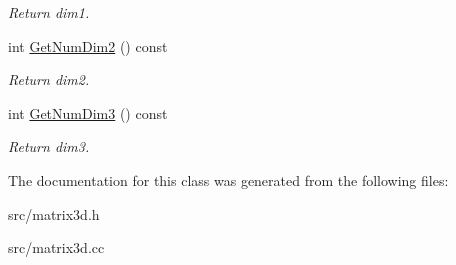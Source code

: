\begin{DoxyCompactItemize}
\begin{DoxyCompactList}\small\item\em Return dim1. \item\end{DoxyCompactList}\item 
\hypertarget{classMatrix3D_ad6895586f9041457377a2b4e0b5778ce}{
int \hyperlink{classMatrix3D_ad6895586f9041457377a2b4e0b5778ce}{GetNumDim2} () const }
\label{d0/dcb/classMatrix3D_ad6895586f9041457377a2b4e0b5778ce}

\begin{DoxyCompactList}\small\item\em Return dim2. \item\end{DoxyCompactList}\item 
\hypertarget{classMatrix3D_aa98e87c6887afa3141cd290818650932}{
int \hyperlink{classMatrix3D_aa98e87c6887afa3141cd290818650932}{GetNumDim3} () const }
\label{d0/dcb/classMatrix3D_aa98e87c6887afa3141cd290818650932}

\begin{DoxyCompactList}\small\item\em Return dim3. \item\end{DoxyCompactList}\end{DoxyCompactItemize}


The documentation for this class was generated from the following files:\begin{DoxyCompactItemize}
\item 
src/matrix3d.h\item 
src/matrix3d.cc\end{DoxyCompactItemize}
